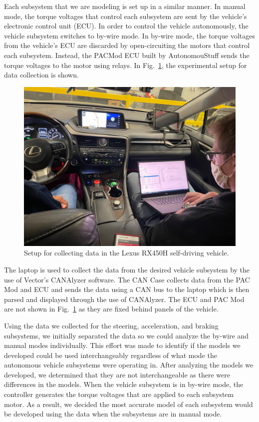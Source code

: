 \documentclass[conference]{IEEEtran}
\begin{document}
Each subsystem that we are modeling is set up in a similar manner. In manual mode, the torque voltages that control each subsystem are sent by the vehicle's electronic control unit (ECU). In order to control the vehicle autonomously, the vehicle subsystem switches to by-wire mode. In by-wire mode, the torque voltages from the vehicle's ECU are discarded by open-circuiting the motors that control each subsystem. Instead, the PACMod ECU built by AutonomouStuff sends the torque voltages to the motor using relays. In Fig.~\ref{fig:vehicleSetup}, the experimental setup for data collection is shown. %
%
\begin{figure}[htbp]
	\centering
  \includegraphics[width=.48\textwidth]{figs/img/picturesVisitToAStuff/dataColletionSetup1-20211007}
  \caption{Setup for collecting data in the Lexus RX450H self-driving vehicle.}
  \label{fig:vehicleSetup}
\end{figure}
%
The laptop is used to collect the data from the desired vehicle subsystem by the use of Vector's CANAlyzer software. The CAN Case collects data from the PAC Mod and ECU and sends the data using a CAN bus to the laptop which is then parsed and displayed through the use of CANAlyzer. The ECU and PAC Mod are not shown in Fig.~\ref{fig:vehicleSetup} as they are fixed behind panels of the vehicle. %

Using the data we collected for the steering, acceleration, and braking subsystems, we initially separated the data so we could analyze the by-wire and manual modes individually. This effort was made to identify if the models we developed could be used interchangeably regardless of what mode the autonomous vehicle subsystems were operating in. After analyzing the models we developed, we determined that they are not interchangeable as there were differences in the models. When the vehicle subsystem is in by-wire mode, the controller generates the torque voltages that are applied to each subsystem motor. As a result, we decided the most accurate model of each subsystem would be developed using the data when the subsystems are in manual mode. %
\end{document}
